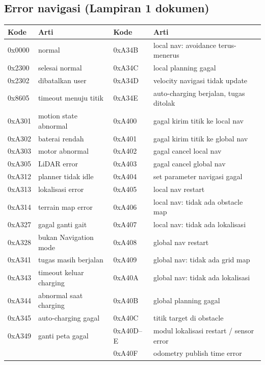\documentclass[11pt,a4paper]{article}
\begin{document}
\subsection{Error navigasi (Lampiran 1 dokumen)}
\begin{xltabular}{\linewidth}{@{}L{18mm}YL{18mm}Y@{}}
\toprule
\textbf{Kode} & \textbf{Arti} & \textbf{Kode} & \textbf{Arti}\\\midrule
\endhead
0x0000 & normal & 0xA34B & local nav: avoidance terus-menerus\\
0x2300 & selesai normal & 0xA34C & local planning gagal\\
0x2302 & dibatalkan user & 0xA34D & velocity navigasi tidak update\\
0x8605 & timeout menuju titik & 0xA34E & auto-charging berjalan, tugas ditolak\\
0xA301 & motion state abnormal & 0xA400 & gagal kirim titik ke local nav\\
0xA302 & baterai rendah & 0xA401 & gagal kirim titik ke global nav\\
0xA303 & motor abnormal & 0xA402 & gagal cancel local nav\\
0xA305 & LiDAR error & 0xA403 & gagal cancel global nav\\
0xA312 & planner tidak idle & 0xA404 & set parameter navigasi gagal\\
0xA313 & lokalisasi error & 0xA405 & local nav restart\\
0xA314 & terrain map error & 0xA406 & local nav: tidak ada obstacle map\\
0xA327 & gagal ganti gait & 0xA407 & local nav: tidak ada lokalisasi\\
0xA328 & bukan Navigation mode & 0xA408 & global nav restart\\
0xA341 & tugas masih berjalan & 0xA409 & global nav: tidak ada grid map\\
0xA343 & timeout keluar charging & 0xA40A & global nav: tidak ada lokalisasi\\
0xA344 & abnormal saat charging & 0xA40B & global planning gagal\\
0xA345 & auto-charging gagal & 0xA40C & titik target di obstacle\\
0xA349 & ganti peta gagal & 0xA40D--E & modul lokalisasi restart / sensor error\\
 & & 0xA40F & odometry publish time error\\
\bottomrule
\end{xltabular}
\end{document}
